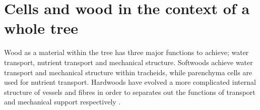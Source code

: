 \section{Cells and wood in the context of a whole tree}
Wood as a material within the tree has three major functions to achieve; water
transport, nutrient transport and mechanical structure. Softwoods
achieve water transport and mechanical structure within tracheids, while
parenchyma cells are used for nutrient transport. Hardwoods have evolved a more
complicated internal structure of vessels and fibres in order to separates out
the functions of transport and mechanical support respectively \cite{walker1993primary}.